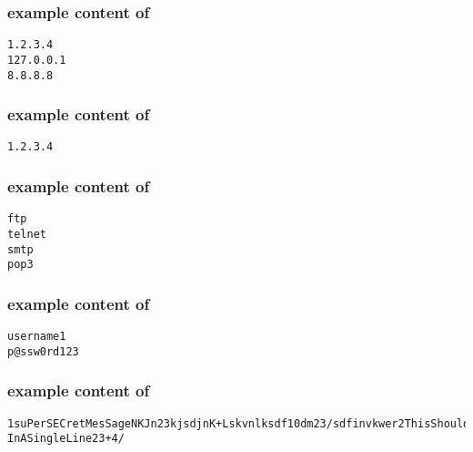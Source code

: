 \hypertarget{clientipformat}{}
\subsubsection*{example content of \texttt{\hyperlink{cp2clientip}{\fileclientip}}}
\begin{mdframed}
\begin{Verbatim}
1.2.3.4
127.0.0.1
8.8.8.8
\end{Verbatim}
\end{mdframed}

\hypertarget{serveripformat}{}
\subsubsection*{example content of \texttt{\hyperlink{cp2serverip}{\fileserverip}}}
\begin{mdframed}
\begin{Verbatim}
1.2.3.4
\end{Verbatim}
\end{mdframed}

\hypertarget{protocolformat}{}
\subsubsection*{example content of \texttt{\hyperlink{cp2protocol}{\fileprotocol}}}
\begin{mdframed}
\begin{Verbatim}
ftp
telnet
smtp
pop3
\end{Verbatim}
\end{mdframed}

\pagebreak

\hypertarget{credformat}{}
\subsubsection*{example content of \texttt{\hyperlink{cp2cred}{\filecred}}}
\begin{mdframed}
\begin{Verbatim}
username1
p@ssw0rd123
\end{Verbatim}
\end{mdframed}

\hypertarget{secretformat}{}
\subsubsection*{example content of \texttt{\hyperlink{cp2secret}{\filesecret}}}
\begin{mdframed}
\begin{Verbatim}
1suPerSECretMesSageNKJn23kjsdjnK+Lskvnlksdf10dm23/sdfinvkwer2ThisShouldBe
InASingleLine23+4/
\end{Verbatim}
\end{mdframed}

